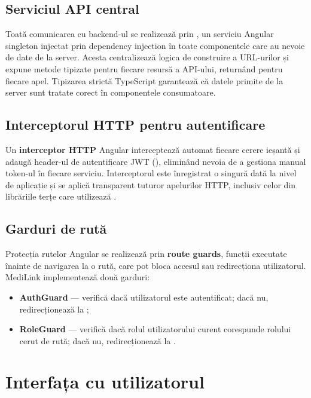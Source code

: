 \subsection{Serviciul API central}

Toată comunicarea cu backend-ul se realizează prin , un serviciu Angular singleton injectat prin dependency injection în toate componentele care au nevoie de date de la server. Acesta centralizează logica de construire a URL-urilor și expune metode tipizate pentru fiecare resursă a API-ului, returnând  pentru fiecare apel. Tipizarea strictă TypeScript garantează că datele primite de la server sunt tratate corect în componentele consumatoare.

\subsection{Interceptorul HTTP pentru autentificare}

Un \textbf{interceptor HTTP} Angular interceptează automat fiecare cerere ieșantă și adaugă header-ul de autentificare JWT (), eliminând nevoia de a gestiona manual token-ul în fiecare serviciu. Interceptorul este înregistrat o singură dată la nivel de aplicație și se aplică transparent tuturor apelurilor HTTP, inclusiv celor din librăriile terțe care utilizează .

\subsection{Garduri de rută}

Protecția rutelor Angular se realizează prin \textbf{route guards}, funcții executate înainte de navigarea la o rută, care pot bloca accesul sau redirecționa utilizatorul. MediLink implementează două garduri:

\begin{itemize}
  \item \textbf{AuthGuard} --- verifică dacă utilizatorul este autentificat; dacă nu, redirecționează la ;
  \item \textbf{RoleGuard} --- verifică dacă rolul utilizatorului curent corespunde rolului cerut de rută; dacă nu, redirecționează la .
\end{itemize}

\section{Interfața cu utilizatorul}


